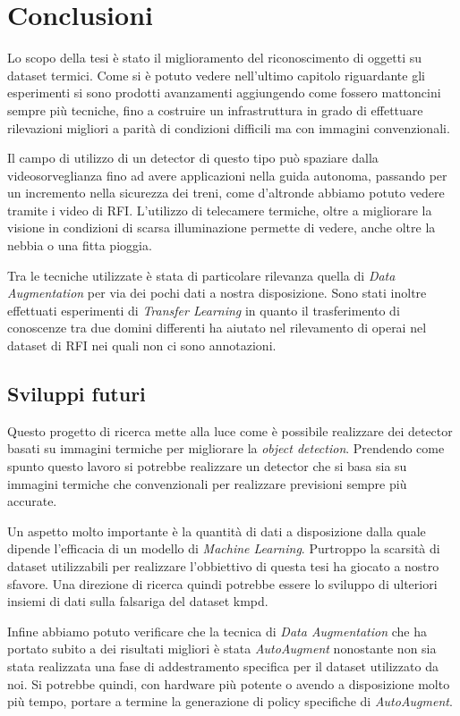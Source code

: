 \chapter{Conclusioni}
Lo scopo della tesi è stato il miglioramento del riconoscimento di oggetti su dataset termici. Come si è potuto vedere nell'ultimo capitolo riguardante gli esperimenti si sono prodotti avanzamenti aggiungendo come fossero mattoncini sempre più tecniche, fino a costruire un infrastruttura in grado di effettuare rilevazioni migliori a parità di condizioni difficili ma con immagini convenzionali. 

Il campo di utilizzo di un detector di questo tipo può spaziare dalla videosorveglianza fino ad avere applicazioni nella guida autonoma, passando per un incremento nella sicurezza dei treni, come d'altronde abbiamo potuto vedere tramite i video di \ac{RFI}. L'utilizzo di telecamere termiche, oltre a migliorare la visione in condizioni di scarsa illuminazione permette di vedere, anche oltre la nebbia o una fitta pioggia. 

Tra le tecniche utilizzate è stata di particolare rilevanza quella di \textit{Data Augmentation} per via dei pochi dati a nostra disposizione. Sono stati inoltre effettuati esperimenti di \textit{Transfer Learning} in quanto il trasferimento di conoscenze tra due domini differenti ha aiutato nel rilevamento di operai nel dataset di \ac{RFI} nei quali non ci sono annotazioni. 

\section{Sviluppi futuri}
Questo progetto di ricerca mette alla luce come è possibile realizzare dei detector basati su immagini termiche per migliorare la \textit{object detection}. Prendendo come spunto questo lavoro si potrebbe realizzare un detector che si basa sia su immagini termiche che convenzionali per realizzare previsioni sempre più accurate.

Un aspetto molto importante è la quantità di dati a disposizione dalla quale dipende l'efficacia di un modello di \textit{Machine Learning}.
Purtroppo la scarsità di dataset utilizzabili per realizzare l'obbiettivo di questa tesi ha giocato a nostro sfavore. Una direzione di ricerca quindi potrebbe essere lo sviluppo di ulteriori insiemi di dati sulla falsariga del dataset \acf{kmpd}. 

Infine abbiamo potuto verificare che la tecnica di \textit{Data Augmentation} che ha portato subito a dei risultati migliori è stata \textit{AutoAugment} nonostante non sia stata realizzata una fase di addestramento specifica per il dataset utilizzato da noi. Si potrebbe quindi, con hardware più potente o avendo a disposizione molto più tempo, portare a termine la generazione di policy specifiche di \textit{AutoAugment}. 